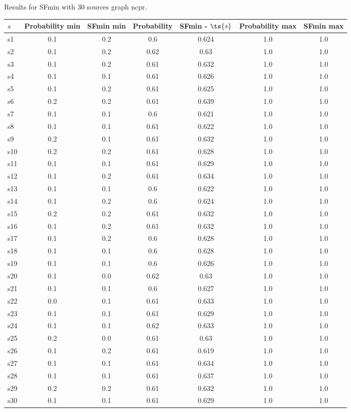 \documentclass{article}
\begin{document}
\noindent Results for SFmin with 30 sources graph ncpr.

\noindent\begin{tabular}{|l|c|c|c|c|c|c|}
\hline
$s$& Probability min & SFmin min & Probability & SFmin - $\ts{s}$ & Probability max & SFmin max\\
\hline
s1 &0.1 & 0.2 & 0.6 & 0.624 & 1.0 & 1.0\\
\hline
s2 &0.1 & 0.2 & 0.62 & 0.63 & 1.0 & 1.0\\
\hline
s3 &0.1 & 0.2 & 0.61 & 0.632 & 1.0 & 1.0\\
\hline
s4 &0.1 & 0.1 & 0.61 & 0.626 & 1.0 & 1.0\\
\hline
s5 &0.1 & 0.2 & 0.61 & 0.625 & 1.0 & 1.0\\
\hline
s6 &0.2 & 0.2 & 0.61 & 0.639 & 1.0 & 1.0\\
\hline
s7 &0.1 & 0.1 & 0.6 & 0.621 & 1.0 & 1.0\\
\hline
s8 &0.1 & 0.1 & 0.61 & 0.622 & 1.0 & 1.0\\
\hline
s9 &0.2 & 0.1 & 0.61 & 0.632 & 1.0 & 1.0\\
\hline
s10 &0.2 & 0.2 & 0.61 & 0.628 & 1.0 & 1.0\\
\hline
s11 &0.1 & 0.1 & 0.61 & 0.629 & 1.0 & 1.0\\
\hline
s12 &0.1 & 0.2 & 0.61 & 0.634 & 1.0 & 1.0\\
\hline
s13 &0.1 & 0.1 & 0.6 & 0.622 & 1.0 & 1.0\\
\hline
s14 &0.1 & 0.2 & 0.6 & 0.624 & 1.0 & 1.0\\
\hline
s15 &0.2 & 0.2 & 0.61 & 0.632 & 1.0 & 1.0\\
\hline
s16 &0.1 & 0.2 & 0.61 & 0.632 & 1.0 & 1.0\\
\hline
s17 &0.1 & 0.2 & 0.6 & 0.628 & 1.0 & 1.0\\
\hline
s18 &0.1 & 0.1 & 0.6 & 0.628 & 1.0 & 1.0\\
\hline
s19 &0.1 & 0.1 & 0.6 & 0.626 & 1.0 & 1.0\\
\hline
s20 &0.1 & 0.0 & 0.62 & 0.63 & 1.0 & 1.0\\
\hline
s21 &0.1 & 0.1 & 0.6 & 0.627 & 1.0 & 1.0\\
\hline
s22 &0.0 & 0.1 & 0.61 & 0.633 & 1.0 & 1.0\\
\hline
s23 &0.1 & 0.1 & 0.61 & 0.629 & 1.0 & 1.0\\
\hline
s24 &0.1 & 0.1 & 0.62 & 0.633 & 1.0 & 1.0\\
\hline
s25 &0.2 & 0.0 & 0.61 & 0.63 & 1.0 & 1.0\\
\hline
s26 &0.1 & 0.2 & 0.61 & 0.619 & 1.0 & 1.0\\
\hline
s27 &0.1 & 0.1 & 0.61 & 0.634 & 1.0 & 1.0\\
\hline
s28 &0.1 & 0.1 & 0.61 & 0.637 & 1.0 & 1.0\\
\hline
s29 &0.2 & 0.2 & 0.61 & 0.632 & 1.0 & 1.0\\
\hline
s30 &0.1 & 0.1 & 0.61 & 0.629 & 1.0 & 1.0\\
\hline
\end{tabular}\\
\end{document}
